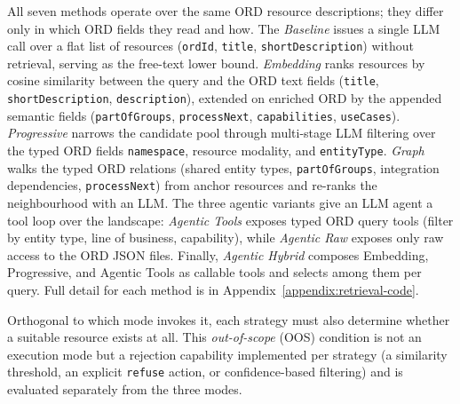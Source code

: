 \documentclass[10pt,twocolumn]{article}
\begin{document}
All seven methods operate over the same ORD resource descriptions; they differ only in which ORD fields they read and how. The \emph{Baseline} issues a single LLM call over a flat list of resources (\texttt{ordId}, \texttt{title}, \texttt{shortDescription}) without retrieval, serving as the free-text lower bound. \emph{Embedding} ranks resources by cosine similarity between the query and the ORD text fields (\texttt{title}, \texttt{shortDescription}, \texttt{description}), extended on enriched ORD by the appended semantic fields (\texttt{partOfGroups}, \texttt{processNext}, \texttt{capabilities}, \texttt{useCases}). \emph{Progressive} narrows the candidate pool through multi-stage LLM filtering over the typed ORD fields \texttt{namespace}, resource modality, and \texttt{entityType}. \emph{Graph} walks the typed ORD relations (shared entity types, \texttt{partOfGroups}, integration dependencies, \texttt{processNext}) from anchor resources and re-ranks the neighbourhood with an LLM. The three agentic variants give an LLM agent a tool loop over the landscape: \emph{Agentic Tools} exposes typed ORD query tools (filter by entity type, line of business, capability), while \emph{Agentic Raw} exposes only raw access to the ORD JSON files. Finally, \emph{Agentic Hybrid} composes Embedding, Progressive, and Agentic Tools as callable tools and selects among them per query. Full detail for each method is in Appendix~\ref{appendix:retrieval-code}.

Orthogonal to which mode invokes it, each strategy must also determine whether a suitable resource exists at all. This \emph{out-of-scope} (OOS) condition is not an execution mode but a rejection capability implemented per strategy (a similarity threshold, an explicit \texttt{refuse} action, or confidence-based filtering) and is evaluated separately from the three modes.
\end{document}

